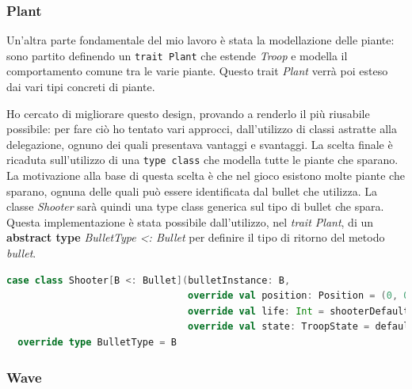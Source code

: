 \subsubsection{Plant}
Un'altra parte fondamentale del mio lavoro è stata la modellazione delle piante: sono partito definendo un \texttt{trait Plant} che estende \textit{Troop} e modella il comportamento comune tra le varie piante. Questo trait \textit{Plant} verrà poi esteso dai vari tipi concreti di piante.

Ho cercato di migliorare questo design, provando a renderlo il più riusabile possibile: per fare ciò ho tentato vari approcci, dall'utilizzo di classi astratte alla delegazione, ognuno dei quali presentava vantaggi e svantaggi. La scelta finale è ricaduta sull'utilizzo di una \texttt{type class} che modella tutte le piante che sparano. La motivazione alla base di questa scelta è che nel gioco esistono molte piante che sparano, ognuna delle quali può essere identificata dal bullet che utilizza.
La classe \textit{Shooter} sarà quindi una type class generica sul tipo di bullet che spara. Questa implementazione è stata possibile dall'utilizzo, nel \textit{trait Plant}, di un \textbf{abstract type} \textit{BulletType <: Bullet} per definire il tipo di ritorno del metodo \textit{bullet}.

\begin{lstlisting}[language=Scala]
case class Shooter[B <: Bullet](bulletInstance: B,
                                override val position: Position = (0, 0),
                                override val life: Int = shooterDefaultLife,
                                override val state: TroopState = defaultPlantState) extends Plant :
  override type BulletType = B
\end{lstlisting}



\subsubsection{Wave}